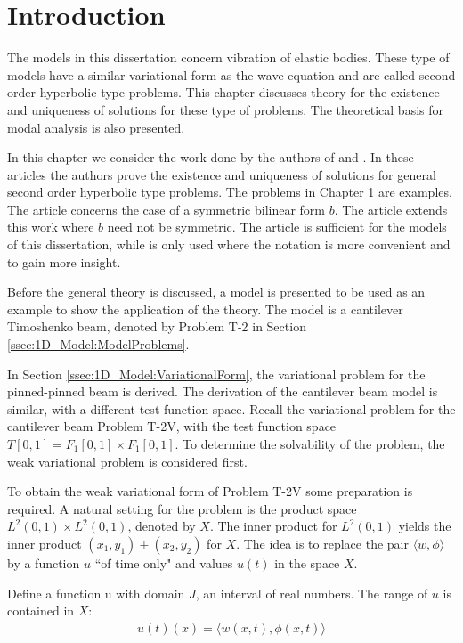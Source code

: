 \documentclass[../../main.tex]{subfiles}
\begin{document}
\section{Introduction} \label{sec:existence}
The models in this dissertation concern vibration of elastic bodies. These type of models have a similar variational form as the wave equation and are called second order hyperbolic type problems. This chapter discusses theory for the existence and uniqueness of solutions for these type of problems. The theoretical basis for modal analysis is also presented.

In this chapter we consider the work done by the authors of \cite{VV02} and \cite{VS19}. In these articles the authors prove the existence and uniqueness of solutions for general second order hyperbolic type problems. The problems in Chapter 1 are examples. The article \cite{VV02} concerns the case of a symmetric bilinear form $b$. The article \cite{VS19} extends this work where $b$ need not be symmetric. The article \cite{VV02} is sufficient for the models of this dissertation, while \cite{VS19} is only used where the notation is more convenient and to gain more insight.

Before the general theory is discussed, a model is presented to be used as an example to show the application of the theory. The model is a cantilever Timoshenko beam, denoted by Problem T-2 in Section \ref{ssec:1D_Model:ModelProblems}.

In Section \ref{ssec:1D_Model:VariationalForm}, the variational problem for the pinned-pinned beam is derived. The derivation of the cantilever beam model is similar, with a different test function space. Recall the variational problem for the cantilever beam Problem T-2V, with the test function space $\displaystyle T[0,1] = F_1[0,1] \times F_1[0,1]$. To determine the solvability of the problem, the weak variational problem is considered first.


To obtain the weak variational form of Problem T-2V some preparation is required. A natural setting for the problem is the product space $L^2(0,1)\times L^2(0,1)$, denoted by $X$. The inner product for $L^2(0,1)$ yields the inner product $\displaystyle (x_1,y_1) + (x_2,y_2)$ for $X$. The idea is to replace the pair $\langle w , \phi \rangle$ by a function $u$ ``of time only" and values $u(t)$ in the space $X$. \label{sym:Ln}

Define a function u with domain $J$, an interval of real numbers. The range of $u$ is contained in $X$:
\begin{eqnarray}
	u(t)(x) = \langle w(x,t), \phi(x,t) \rangle \label{def_of_u}
\end{eqnarray}
\end{document}
